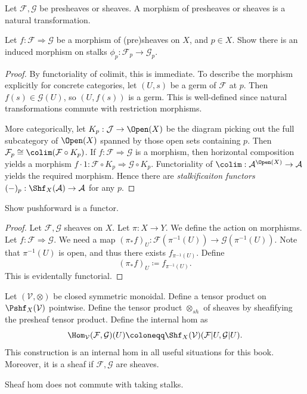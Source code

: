 \begin{definition}\label{dfn:2-3-1}
	Let $\mathcal{F} ,\mathcal{G} $ be presheaves or sheaves. A morphism of presheaves or sheaves is a natural transformation.
\end{definition}

\begin{exercise}\label{ex:2-3-2}
	Let $f : \mathcal{F}  \Rightarrow \mathcal{G} $ be a morphism of (pre)sheaves on $X$, and $p\in X$. Show there is an induced morphism on stalks $\phi _p : \mathcal{F} _p \to \mathcal{G} _p$.
\end{exercise}
\begin{proof}
	By functoriality of colimit, this is immediate. To describe the morphism explicitly for concrete categories, let $(U,s)$ be a germ of $\mathcal{F} $ at $p$. Then $f(s)\in \mathcal{G} (U)$, so $(U,f(s))$ is a germ. This is well-defined since natural transformations commute with restriction morphisms.

	More categorically, let $K_p : \mathcal{J}  \to \Open(X) $ be the diagram picking out the full subcategory of $\Open(X) $ spanned by those open sets containing $p$. Then $\mathcal{F} _p \cong \colim (\mathcal{F} \circ K_p)$. If $f : \mathcal{F}  \Rightarrow \mathcal{G} $ is a morphism, then horizontal composition yields a morphism $f\cdot 1 : \mathcal{F} \circ K_p \Rightarrow \mathcal{G} \circ K_p$. Functoriality of $\colim : \mathcal{A} ^{\Open(X) }  \to \mathcal{A} $ yields the required morphism. Hence there are \emph{stalkificaiton functors} $(-)_p : \Shf_X(\mathcal{A} )\to \mathcal{A} $ for any $p$.
\end{proof}

\begin{exercise}\label{ex:2-3-3}
	Show pushforward is a functor.
\end{exercise}
\begin{proof}
	Let $\mathcal{F},\mathcal{G}$ sheaves on $X$. Let $\pi : X \to Y$. We define the action on morphisms. Let $f: \mathcal{F}  \Rightarrow \mathcal{G} $. We need a map $(\pi _*f)_U : \mathcal{F} (\pi ^{-1} (U)) \to \mathcal{G} (\pi ^{-1} (U))$. Note that $\pi ^{-1} (U)$ is open, and thus there exists $f_{\pi ^{-1} (U)} $. Define
	\[
		(\pi _*f)_U\coloneqq f_{\pi ^{-1} (U)} 
	.\]
	This is evidentally functorial.
\end{proof}

\begin{definition}\label{dfn:2-3-4}
	Let $(\mathcal{V} , \otimes )$ be closed symmetric monoidal. Define a tensor product on $\Pshf_X(\mathcal{V} )$ pointwise. Define the tensor product $\otimes_{sh} $ of sheaves by sheafifying the presheaf tensor product. Define the internal hom as
	\[
		\Hom_{\mathcal{V} }(\mathcal{F} , \mathcal{G} ) (U) \coloneqq \Shf_X(\mathcal{V} )(\mathcal{F} |U,\mathcal{G} |U)
	.\]
	This construction is an internal hom in all useful situations for this book. Moreover, it is a sheaf if $\mathcal{F} ,\mathcal{G} $ are sheaves.
\end{definition}
\begin{warning}\label{warn:2-3-5}
	Sheaf hom does not commute with taking stalks.
\end{warning}

